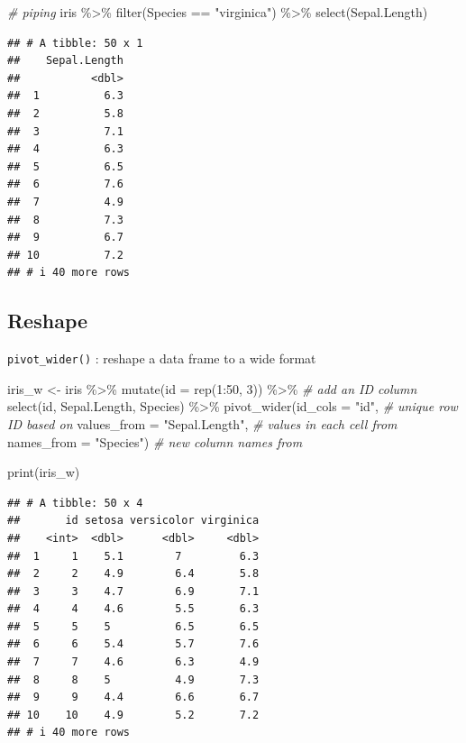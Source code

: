 \documentclass[
]{book}
\newenvironment{Shaded}{\begin{snugshade}}{\end{snugshade}}
\newcommand{\AttributeTok}[1]{\textcolor[rgb]{0.77,0.63,0.00}{#1}}
\newcommand{\CommentTok}[1]{\textcolor[rgb]{0.56,0.35,0.01}{\textit{#1}}}
\newcommand{\DecValTok}[1]{\textcolor[rgb]{0.00,0.00,0.81}{#1}}
\newcommand{\FunctionTok}[1]{\textcolor[rgb]{0.00,0.00,0.00}{#1}}
\newcommand{\NormalTok}[1]{#1}
\newcommand{\OtherTok}[1]{\textcolor[rgb]{0.56,0.35,0.01}{#1}}
\newcommand{\SpecialCharTok}[1]{\textcolor[rgb]{0.00,0.00,0.00}{#1}}
\newcommand{\StringTok}[1]{\textcolor[rgb]{0.31,0.60,0.02}{#1}}
\begin{document}
\begin{Shaded}
\begin{Highlighting}[]
\CommentTok{\# piping}
\NormalTok{iris }\SpecialCharTok{\%\textgreater{}\%} 
  \FunctionTok{filter}\NormalTok{(Species }\SpecialCharTok{==} \StringTok{"virginica"}\NormalTok{) }\SpecialCharTok{\%\textgreater{}\%} 
  \FunctionTok{select}\NormalTok{(Sepal.Length)}
\end{Highlighting}
\end{Shaded}

\begin{verbatim}
## # A tibble: 50 x 1
##    Sepal.Length
##           <dbl>
##  1          6.3
##  2          5.8
##  3          7.1
##  4          6.3
##  5          6.5
##  6          7.6
##  7          4.9
##  8          7.3
##  9          6.7
## 10          7.2
## # i 40 more rows
\end{verbatim}

\hypertarget{reshape}{%
\subsection{Reshape}\label{reshape}}

\texttt{pivot\_wider()} : reshape a data frame to a wide format

\begin{Shaded}
\begin{Highlighting}[]
\NormalTok{iris\_w }\OtherTok{\textless{}{-}}\NormalTok{ iris }\SpecialCharTok{\%\textgreater{}\%} 
  \FunctionTok{mutate}\NormalTok{(}\AttributeTok{id =} \FunctionTok{rep}\NormalTok{(}\DecValTok{1}\SpecialCharTok{:}\DecValTok{50}\NormalTok{, }\DecValTok{3}\NormalTok{)) }\SpecialCharTok{\%\textgreater{}\%} \CommentTok{\# add an ID column}
  \FunctionTok{select}\NormalTok{(id, Sepal.Length, Species) }\SpecialCharTok{\%\textgreater{}\%} 
  \FunctionTok{pivot\_wider}\NormalTok{(}\AttributeTok{id\_cols =} \StringTok{"id"}\NormalTok{, }\CommentTok{\# unique row ID based on}
              \AttributeTok{values\_from =} \StringTok{"Sepal.Length"}\NormalTok{, }\CommentTok{\# values in each cell from}
              \AttributeTok{names\_from =} \StringTok{"Species"}\NormalTok{) }\CommentTok{\# new column names from}

\FunctionTok{print}\NormalTok{(iris\_w)}
\end{Highlighting}
\end{Shaded}

\begin{verbatim}
## # A tibble: 50 x 4
##       id setosa versicolor virginica
##    <int>  <dbl>      <dbl>     <dbl>
##  1     1    5.1        7         6.3
##  2     2    4.9        6.4       5.8
##  3     3    4.7        6.9       7.1
##  4     4    4.6        5.5       6.3
##  5     5    5          6.5       6.5
##  6     6    5.4        5.7       7.6
##  7     7    4.6        6.3       4.9
##  8     8    5          4.9       7.3
##  9     9    4.4        6.6       6.7
## 10    10    4.9        5.2       7.2
## # i 40 more rows
\end{verbatim}
\end{document}

